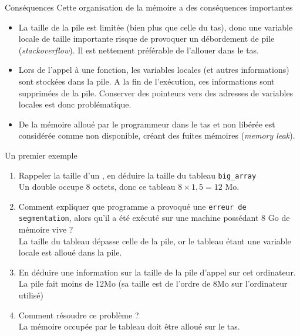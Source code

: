\documentclass[10pt]{beamer}
\begin{document}
\begin{frame}{\Ctitle}{\stitle}
	\begin{block}{Conséquences}
		Cette organisation de la mémoire a des conséquences importantes
		\begin{itemize}
			\item<1-> La taille de la pile est limitée (bien plus que celle du tas), donc une variable locale de taille importante risque de provoquer un débordement de pile (\textit{stackoverflow}). Il est nettement préférable de l'allouer dans le tas.
			\item<2-> Lors de l'appel à une fonction, les variables locales (et autres informations) sont stockées dans la pile. A la fin de l'exécution, ces informations sont supprimées de la pile. Conserver des pointeurs vers des adresses de variables locales est donc problématique.
			\item<3-> De la mémoire alloué par le programmeur dans le tas et non libérée est considérée comme non disponible, créant des fuites mémoires (\textit{memory leak}).
		\end{itemize}
	\end{block}
\end{frame}

\begin{frame}[fragile]{\Ctitle}{\stitle}
	\begin{exampleblock}{Un premier exemple}
		{\small
		\begin{enumerate}
			\item<1-> Rappeler la taille d'un , en déduire la taille du tableau {\tt big\_array} \\
				\onslide<5-> {\textcolor{OliveGreen}{Un double occupe 8 octets, donc ce tableau $8 \times 1,5 = 12$ Mo.}}
			\item<2-> Comment expliquer que programme a provoqué une {\tt erreur de segmentation}, alors qu'il a été exécuté sur une machine possédant 8 Go de mémoire vive ?\\
				\onslide<6-> {\textcolor{OliveGreen}{La taille du tableau dépasse celle de la pile, or le tableau étant une variable locale est alloué dans la pile.}}
			\item<3-> En déduire une information sur la taille de la pile d'appel sur cet ordinateur. \\
				\onslide<7-> {\textcolor{OliveGreen}{La pile fait moins de 12Mo (sa taille est de l'ordre de 8Mo sur l'ordinateur utilisé)}}
			\item<4-> Comment résoudre ce problème ? \\
				\onslide<8-> {\textcolor{OliveGreen}{La mémoire occupée par le tableau doit être alloué sur le tas.}}
		\end{enumerate}}
	\end{exampleblock}
\end{frame}
\end{document}
